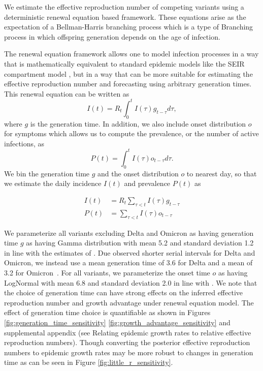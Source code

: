 \documentclass[11pt,oneside,letterpaper]{article}
\begin{document}
We estimate the effective reproduction number of competing variants using a deterministic renewal equation based framework. These equations arise as the expectation of a Bellman-Harris branching process \cite{Bellman1948} which is a type of Branching process in which offspring generation depends on the age of infection.

The renewal equation framework allows one to model infection processes in a way that is mathematically equivalent to standard epidemic models like the SEIR compartment model \cite{Champredon2018}, but in a way that can be more suitable for estimating the effective reproduction number and forecasting using arbitrary generation times. This renewal equation can be written as
\begin{equation}
  I(t) = R_{t} \int_{0}^{t} I(\tau)g_{t-\tau} d\tau,
\end{equation}
where $g$ is the generation time.
In addition, we also include onset distribution $o$ for symptoms which allows us to compute the prevalence, or the number of active infections, as
\begin{equation}
  P(t) = \int_{0}^{t} I(\tau) o_{t-\tau} d \tau.
\end{equation}
We bin the generation time $g$ and the onset distribution $o$ to nearest day, so that we estimate the daily incidence $I(t)$ and prevalence $P(t)$ as

\begin{align}
  I(t) &= R_{t} \sum_{\tau < t} I(\tau) g_{t-\tau}\\
  P(t) &= \sum_{\tau < t} I(\tau) o_{t-\tau}
\end{align}

We parameterize all variants excluding Delta and Omicron as having generation time $g$ as having Gamma distribution with mean 5.2 and standard deviation 1.2 in line with the estimates of \cite{Ganyani2020}.
Due observed shorter serial intervals for Delta and Omicron, we instead use a mean generation time of 3.6 for Delta and a mean of 3.2 for Omicron\ \cite{Backer2022, Ryu2022, Song2022}.
For all variants, we parameterize the onset time $o$ as having LogNormal with mean 6.8 and standard deviation 2.0 in line with \cite{Cheng2021}.
We note that the choice of generation time can have strong effects on the inferred effective reproduction number and growth advantage under renewal equation model.
The effect of generation time choice is quantifiable as shown in Figures \ref{fig:generation_time_sensitivity} \ref{fig:growth_advantage_sensitivity} and supplemental appendix (see Relating epidemic growth rates to relative effective reproduction numbers).
Though converting the posterior effective reproduction numbers to epidemic growth rates may be more robust to changes in generation time as can be seen in Figure \ref{fig:little_r_sensitivity}.
\end{document}
